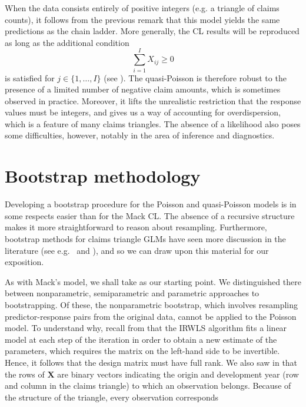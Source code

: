 \documentclass[a4paper]{book}
\begin{document}
When the data consists entirely of positive integers (e.g. a triangle of claims counts), it follows from the previous remark that this model yields the same predictions as the chain ladder. More generally, the CL results will be reproduced as long as the additional condition
\begin{equation}
  \sum_{i = 1}^I X_{ij} \geq 0
\end{equation}
is satisfied for $j \in \{ 1, \dots, I \}$ (see \cite[Section 2]{renshaw}). The quasi-Poisson is therefore robust to the presence of a limited number of negative claim amounts, which is sometimes observed in practice. Moreover, it lifts the unrealistic restriction that the response values must be integers, and gives us a way of accounting for overdispersion, which is a feature of many claims triangles. The absence of a likelihood also poses some difficulties, however, notably in the area of inference and diagnostics.

\section{Bootstrap methodology}

Developing a bootstrap procedure for the Poisson and quasi-Poisson models is in some respects easier than for the Mack CL. The absence of a recursive structure makes it more straightforward to reason about resampling. Furthermore, bootstrap methods for claims triangle GLMs have seen more discussion in the literature (see e.g.\ \cite{pinheiro} and \cite{england:dist}), and so we can draw upon this material for our exposition. 

As with Mack's model, we shall take  as our starting point. We distinguished there between nonparametric, semiparametric and parametric approaches to bootstrapping. Of these, the nonparametric bootstrap, which involves resampling predictor-response pairs from the original data, cannot be applied to the Poisson model. To understand why, recall from  that the IRWLS algorithm fits a linear model at each step of the iteration in order to obtain a new estimate of the parameters, which requires the matrix on the left-hand side to be invertible. Hence, it follows that the design matrix must have full rank. We also saw in  that the rows of $\mathbf{X}$ are binary vectors indicating the origin and development year (row and column in the claims triangle) to which an observation belongs. Because of the structure of the triangle, every observation corresponds
\end{document}
